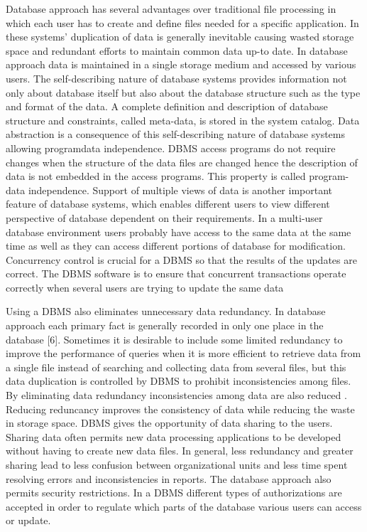 Database approach has several advantages over traditional file processing
in which each user has to create and define files needed for a specific application.
In these systems' duplication of data is generally inevitable causing wasted storage
space and redundant efforts to maintain common data up-to date. In database
approach data is maintained in a single storage medium and accessed by various
users. The self-describing nature of database systems provides information not
only about database itself but also about the database structure such as the type and
format of the data. A complete definition and description of database structure and
constraints, called meta-data, is stored in the system catalog. Data abstraction is a
consequence of this self-describing nature of database systems allowing programdata independence. 
DBMS access programs do not require changes when the structure of the data files are changed hence 
the description of data is not embedded in the access programs. This property is called program-data
independence. Support of multiple views of data is another important feature of
database systems, which enables different users to view different perspective of
database dependent on their requirements. In a multi-user database environment
users probably have access to the same data at the same time as well as they can
access different portions of database for modification. Concurrency control is
crucial for a DBMS so that the results of the updates are correct. The DBMS
software is to ensure that concurrent transactions operate correctly when several
users are trying to update the same data

Using a DBMS also eliminates unnecessary data redundancy. In database
approach each primary fact is generally recorded in only one place in the database
[6]. Sometimes it is desirable to include some limited redundancy to improve the
performance of queries when it is more efficient to retrieve data from a single file
instead of searching and collecting data from several files, but this data duplication
is controlled by DBMS to prohibit inconsistencies among files. By
eliminating data redundancy inconsistencies among data are also reduced \cite{elmasri1998}.
Reducing reduncancy improves the consistency of data while reducing the waste
in storage space. DBMS gives the opportunity of data sharing to the users. Sharing
data often permits new data processing applications to be developed without
having to create new data files. In general, less redundancy and greater sharing
lead to less confusion between organizational units and less time spent resolving
errors and inconsistencies in reports. The database approach also permits security
restrictions. In a DBMS different types of authorizations are accepted in order to
regulate which parts of the database various users can access or update. 